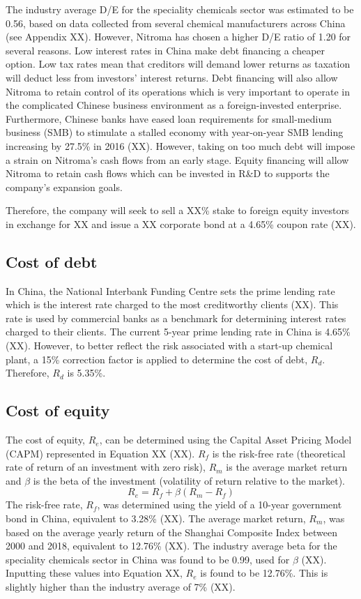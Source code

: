 The industry average D/E for the speciality chemicals sector was estimated to be 0.56, based on data collected from several chemical manufacturers across China (see Appendix XX). However, Nitroma has chosen a higher D/E ratio of 1.20 for several reasons. Low interest rates in China make debt financing a cheaper option. Low tax rates mean that creditors will demand lower returns as taxation will deduct less from investors’ interest returns. Debt financing will also allow Nitroma to retain control of its operations which is very important to operate in the complicated Chinese business environment as a foreign-invested enterprise. Furthermore, Chinese banks have eased loan requirements for small-medium business (SMB) to stimulate a stalled economy with year-on-year SMB lending increasing by 27.5\% in 2016 (XX). However, taking on too much debt will impose a strain on Nitroma’s cash flows from an early stage. Equity financing will allow Nitroma to retain cash flows which can be invested in R\&D to supports the company’s expansion goals.

Therefore, the company will seek to sell a XX\% stake to foreign equity investors in exchange for XX and issue a XX corporate bond at a 4.65\% coupon rate (XX).

\subsection{Cost of debt}
In China, the National Interbank Funding Centre sets the prime lending rate which is the interest rate charged to the most creditworthy clients (XX). This rate is used by commercial banks as a benchmark for determining interest rates charged to their clients. The current 5-year prime lending rate in China is 4.65\% (XX). However, to better reflect the risk associated with a start-up chemical plant, a 15\% correction factor is applied to determine the cost of debt, $R_{d}$. Therefore, $R_{d}$ is 5.35\%.

\subsection{Cost of equity}
The cost of equity, $R_{e}$, can be determined using the Capital Asset Pricing Model (CAPM) represented in Equation XX (XX). $R_{f}$ is the risk-free rate (theoretical rate of return of an investment with zero risk), $R_{m}$ is the average market return and $\beta$ is the beta of the investment (volatility of return relative to the market).
\begin{equation}
\label{eqn:capm}
    R_{e}=R_{f}+\beta(R_{m}-R_{f})
\end{equation}
The risk-free rate, $R_{f}$, was determined using the yield of a 10-year government bond in China, equivalent to 3.28\% (XX). The average market return, $R_{m}$, was based on the average yearly return of the Shanghai Composite Index between 2000 and 2018, equivalent to 12.76\% (XX). The industry average beta for the speciality chemicals sector in China was found to be 0.99, used for $\beta$ (XX). Inputting these values into Equation XX, $R_{e}$ is found to be 12.76\%. This is slightly higher than the industry average of 7\% (XX).

